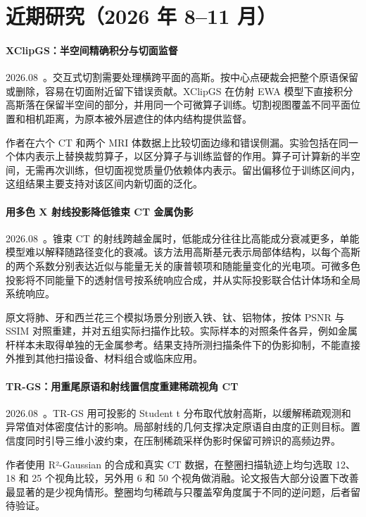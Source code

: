 \section{近期研究（2026 年 8--11 月）}
\paragraph{XClipGS：半空间精确积分与切面监督}
2026.08~\cite{2608_07760}。交互式切割需要处理横跨平面的高斯。按中心点硬裁会把整个原语保留或删除，容易在切面附近留下错误贡献。XClipGS 在仿射 EWA 模型下直接积分高斯落在保留半空间的部分，并用同一个可微算子训练。切割视图覆盖不同平面位置和相机距离，为原本被外层遮住的体内结构提供监督。

作者在六个 CT 和两个 MRI 体数据上比较切面边缘和错误侧漏。实验包括在同一个体内表示上替换裁剪算子，以区分算子与训练监督的作用。算子可计算新的半空间，无需再次训练，但切面视觉质量仍依赖体内表示。留出偏移位于训练区间内，这组结果主要支持对该区间内新切面的泛化。

\paragraph{用多色 X 射线投影降低锥束 CT 金属伪影}
2026.08~\cite{2608_13159}。锥束 CT 的射线跨越金属时，低能成分往往比高能成分衰减更多，单能模型难以解释随路径变化的衰减。该方法用高斯基元表示局部体结构，以每个高斯的两个系数分别表达近似与能量无关的康普顿项和随能量变化的光电项。可微多色投影将不同能量下的透射信号按系统响应合成，并从实际投影联合估计体场和全局系统响应。

原文将肺、牙和西兰花三个模拟场景分别嵌入铁、钛、铝物体，按体 PSNR 与 SSIM 对照重建，并对五组实际扫描作比较。实际样本的对照条件各异，例如金属杆样本未取得单独的无金属参考。结果支持所测扫描条件下的伪影抑制，不能直接外推到其他扫描设备、材料组合或临床应用。

\paragraph{TR-GS：用重尾原语和射线置信度重建稀疏视角 CT}
2026.08~\cite{2608_16042}。TR-GS 用可投影的 Student t 分布取代放射高斯，以缓解稀疏观测和异常值对体密度估计的影响。局部射线的几何支撑决定原语自由度的正则目标。置信度同时引导三维小波约束，在压制稀疏采样伪影时保留可辨识的高频边界。

作者使用 R²-Gaussian 的合成和真实 CT 数据，在整圈扫描轨迹上均匀选取 12、18 和 25 个视角比较，另外用 6 和 50 个视角做消融。论文报告大部分设置下改善最显著的是少视角情形。整圈均匀稀疏与只覆盖窄角度属于不同的逆问题，后者留待验证。

